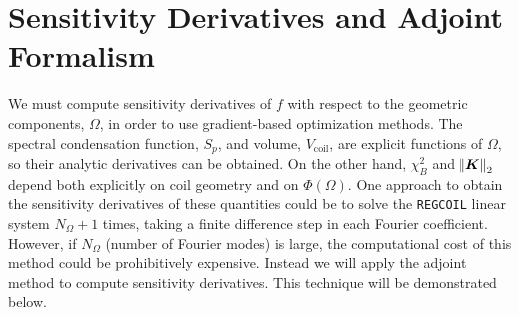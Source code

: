 \documentclass[aps,unsortedaddress]{revtex4-1}
\begin{document}
\section{Sensitivity Derivatives and Adjoint Formalism}
\label{sect_adjoint}
We must compute sensitivity derivatives of $f$ with respect to the geometric components, $\Omega$, in order to use gradient-based optimization methods. The spectral condensation function, $S_p$, and volume, $V_{\text{coil}}$, are explicit functions of $\Omega$, so their analytic derivatives can be obtained. On the other hand, $\chi^2_B$ and $\norm{\bm{K}}_2$ depend both explicitly on coil geometry and on $\Phi(\Omega)$. One approach to obtain the sensitivity derivatives of these quantities could be to solve the \texttt{REGCOIL} linear system $N_{\Omega} +1$ times, taking a finite difference step in each Fourier coefficient. However, if $N_{\Omega}$ (number of Fourier modes) is large, the computational cost of this method could be prohibitively expensive. Instead we will apply the adjoint method to compute sensitivity derivatives. This technique will be demonstrated below. 
\end{document}
